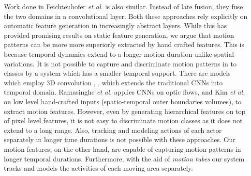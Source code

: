 Work done in Feichtenhofer \textit{et al.}\cite{feichtenhofer2016convolutional} is also similar. Instead of late fusion,
they fuse the two domains in a convolutional layer. Both these approaches rely explicitly on automatic feature
generation in increasingly abstract layers. While this has provided promising results on static feature generation,
we argue that motion patterns can be more more superiorly extracted by hand crafted features. This is because
temporal dynamics extend to a longer motion duration unlike spatial variations. It is not possible
to capture and discriminate motion patterns in to classes by a system which has a smaller temporal support. There are models
which employ 3D convolution \cite{ji20133d}, \cite{tran2015learning}, which extends the traditional CNNs into temporal domain.
Ramasinghe \textit{et al.}\cite{7486474} applies CNNs on optic flows, and Kim \textit{et al.}\cite{kim2007human} on low level hand-crafted inputs
(spatio-temporal outer boundaries volumes), to extract motion features. However, even by generating hierarchical
features on top of pixel level features, it is not easy to discriminate motion classes as it does not extend to a long range.
Also, tracking and modeling actions of each actor separately in longer time durations is not possible with these
approaches. Our motion features, on the other hand, are capable of capturing motion patterns in longer temporal durations.
Furthermore, with the aid of \textit{motion tubes} our system tracks and models the activities of each moving area separately.

